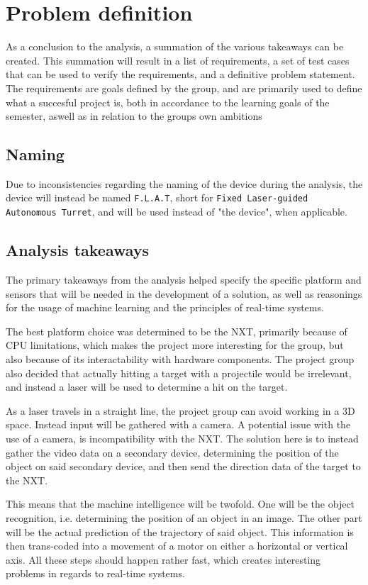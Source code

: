\newpage
\section{Problem definition}
As a conclusion to the analysis, a summation of the various takeaways can be created. 
This summation will result in a list of requirements, a set of test cases that can be used to verify the requirements, and a definitive problem statement.
The requirements are goals defined by the group, and are primarily used to define what a succesful project is, both in accordance to the learning goals of the semester, aswell as in relation to the groups own ambitions

\subsection{Naming}
Due to inconsistencies regarding the naming of the device during the analysis, the device will instead be named \texttt{F.L.A.T}, short for \texttt{Fixed Laser-guided Autonomous Turret}, and will be used instead of "the device", when applicable.

\subsection{Analysis takeaways}
The primary takeaways from the analysis helped specify the specific platform and sensors that will be needed in the development of a solution, as well as reasonings for the usage of machine learning and the principles of real-time systems.

The best platform choice was determined to be the NXT, primarily because of CPU limitations, which makes the project more interesting for the group, but also because of its interactability with hardware components.
The project group also decided that actually hitting a target with a projectile would be irrelevant, and instead a laser will be used to determine a hit on the target.

As a laser travels in a straight line, the project group can avoid working in a 3D space.
Instead input will be gathered with a camera.
A potential issue with the use of a camera, is incompatibility with the NXT.
The solution here is to instead gather the video data on a secondary device, determining the position of the object on said secondary device, and then send the direction data of the target to the NXT.

This means that the machine intelligence will be twofold.
One will be the object recognition, i.e. determining the position of an object in an image.
The other part will be the actual prediction of the trajectory of said object.
This information is then trans-coded into a movement of a motor on either a horizontal or vertical axis.
All these steps should happen rather fast, which creates interesting problems in regards to real-time systems.

